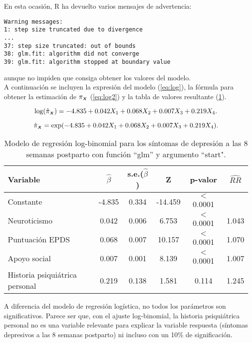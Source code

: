 En esta ocasión, R ha devuelto varios mensajes de advertencia:
\begin{Verbatim}[xleftmargin=2.5cm]
Warning messages:
1: step size truncated due to divergence
...
37: step size truncated: out of bounds
38: glm.fit: algorithm did not converge
39: glm.fit: algorithm stopped at boundary value
\end{Verbatim}

aunque no impiden que consiga obtener los valores del modelo. \\

A continuación se incluyen la expresión del modelo (\ref{eq:log}), la fórmula para obtener la estimación de $\pi_{\mathsmaller{\boldsymbol{X}}}$  (\ref{eq:log2}) y la tabla de valores resultante (\ref{tab:10}).

\begin{equation}
\label{eq:log}
\log(\hat{\pi}_{\mathsmaller{\boldsymbol{X}}})=-4.835+0.042X_1+0.068X_2+0.007X_3+0.219X_4.
\end{equation}


\begin{equation}
\label{eq:log2}
\hat{\pi}_{\mathsmaller{\boldsymbol{X}}}=\exp(-4.835+0.042X_1+0.068X_2+0.007X_3+0.219X_4).
\end{equation}


\begin{table} [H]
	\centering
	\begin{tabular}{l c c c c c}
		\toprule
		\textbf{Variable} & $\hat{\beta}$ & s.e.($\hat{\beta}$) & Z & p-valor & $\widehat{RR}$\\
		\midrule
		Constante &  -4.835&  0.334&-14.459 & $<$ 0.0001 &  \\
		Neuroticismo &   0.042 & 0.006 &  6.753& $<$ 0.0001 & 1.043 \\
		Puntuación EPDS &  0.068  &0.007  &10.157&  $<$ 0.0001 & 1.070\\
		Apoyo social &  0.007 & 0.001   &8.139 &$<$ 0.0001 & 1.007\\
		Historia psiquiátrica personal & 0.219 &  0.138 & 1.581  &  0.114 &1.245 \\
		\bottomrule
	\end{tabular}
	\caption{Modelo de regresión log-binomial para los síntomas de depresión a las 8 semanas postparto con función ``glm'' y argumento ``start".}
	\label{tab:10}
\end{table}

A diferencia del modelo de regresión logística, no todos los parámetros son significativos. Parece ser que, con el ajuste log-binomial, la historia psiquiátrica personal no es una variable relevante para explicar la variable respuesta (síntomas depresivos a las 8 semanas postparto) ni incluso con un 10\% de significación.\\

